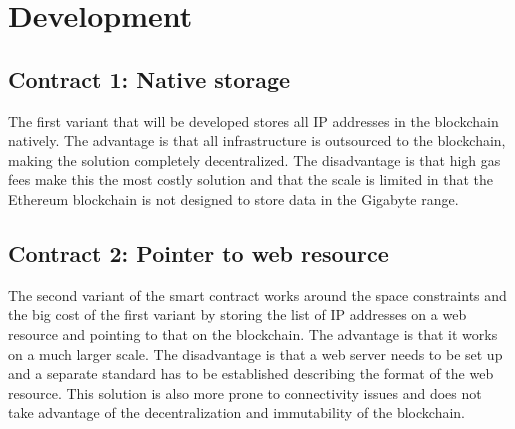 \chapter{Development}

\section{Contract 1: Native storage}
The first variant that will be developed stores all IP addresses in the blockchain natively. The advantage is that all infrastructure is outsourced to the blockchain, making the solution completely decentralized. The disadvantage is that high gas fees make this the most costly solution and that the scale is limited in that the Ethereum blockchain is not designed to store data in the Gigabyte range.

\section{Contract 2: Pointer to web resource}
The second variant of the smart contract works around the space constraints and the big cost of the first variant by storing the list of IP addresses on a web resource and pointing to that on the blockchain. The advantage is that it works on a much larger scale. The disadvantage is that a web server needs to be set up and a separate standard has to be established describing the format of the web resource. This solution is also more prone to connectivity issues and does not take advantage of the decentralization and immutability of the blockchain.

